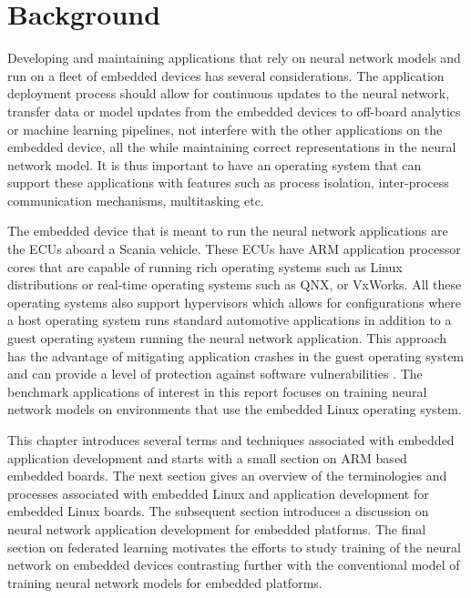 
\chapter{Background}

Developing and maintaining applications that rely on neural network models and run on a fleet of embedded devices has several considerations. The application deployment process should allow for continuous updates to the neural network, transfer data or model updates from the embedded devices to off-board analytics or machine learning pipelines, not interfere with the other applications on the embedded device, all the while maintaining correct representations in the neural network model. It is thus important to have an operating system that can support these applications with features such as process isolation, inter-process communication mechanisms, multitasking etc.

The embedded device that is meant to run the neural network applications are the ECUs aboard a Scania vehicle. These ECUs have ARM application processor cores that are capable of running rich operating systems such as Linux distributions or real-time operating systems such as QNX, or VxWorks. All these operating systems also support hypervisors which allows for configurations where a host operating system runs standard automotive applications in addition to a guest operating system running the neural network application. This approach has the advantage of mitigating application crashes in the guest operating system and can provide a level of protection against software vulnerabilities \cite{Linux-guest-os}. The benchmark applications of interest in this report focuses on training neural network models on environments that use the embedded Linux operating system.

This chapter introduces several terms and techniques associated with embedded application development and starts with a small section on ARM based embedded boards. The next section gives an overview of the terminologies and processes associated with embedded Linux and application development for embedded Linux boards. The subsequent section introduces a discussion on neural network application development for embedded platforms. The final section on federated learning motivates the efforts to study training of the neural network on embedded devices contrasting further with the conventional model of training neural network models for embedded platforms.

